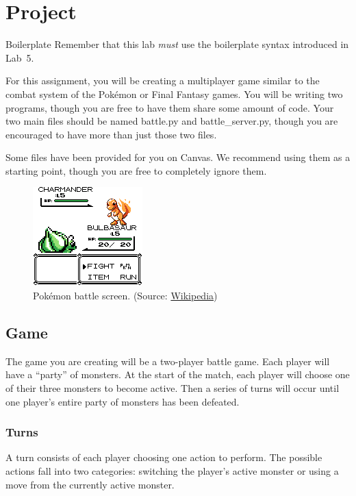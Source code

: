 \documentclass[11pt]{cselabheader}
\begin{document}
\pagebreak

\section{Project}
\label{sec:proj}

\begin{warningbox}{Boilerplate}
  Remember that this lab \emph{must} use the
  boilerplate syntax introduced in Lab~5.
\end{warningbox}

For this assignment, you will be creating a multiplayer game similar to the
combat system of the Pok\'emon or Final Fantasy games. You will be writing
two programs, though you are free to have them share some amount of code.
Your two main files should be named battle.py and battle\_server.py, though
you are encouraged to have more than just those two files.

Some files have been provided for you on Canvas. We recommend using them as
a starting point, though you are free to completely ignore them.

\begin{figure}[h]
  \centering
  \includegraphics{img/Bulbasaur_pokemon_red}
  \caption{Pok\'emon battle screen. (Source:
    \href{http://en.wikipedia.org/wiki/File:Bulbasaur_pokemon_red.png}{Wikipedia})}
  \label{poke}
\end{figure}

\subsection{Game}
The game you are creating will be a two-player battle game. Each player will
have a ``party'' of monsters. At the start of the match, each player will choose
one of their three monsters to become active. Then a series of turns will occur
until one player's entire party of monsters has been defeated.

\subsubsection{Turns}
\label{subsubsec:turn}
A turn consists of each player choosing one action to perform. The possible
actions fall into two categories: switching the player's active monster or using
a move from the currently active monster.
\end{document}
